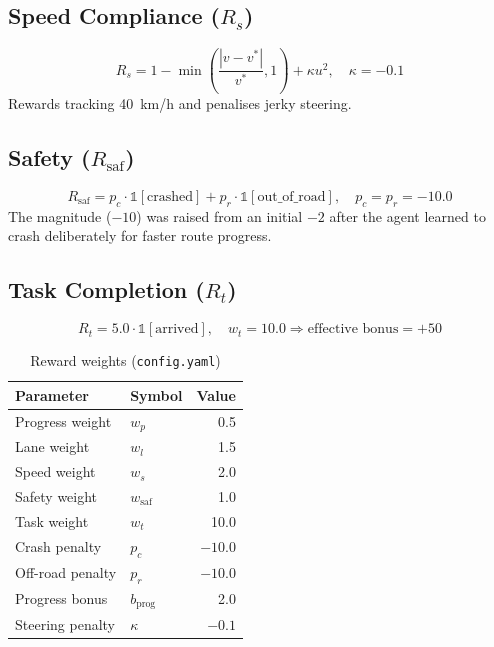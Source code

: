 \documentclass[12pt,a4paper]{report}
\begin{document}
\subsection{Speed Compliance ($R_s$)}
\begin{equation}
R_s = 1 - \min\!\left(\frac{|v-v^*|}{v^*}, 1\right) + \kappa u^2, \quad \kappa = -0.1
\end{equation}
Rewards tracking 40~km/h and penalises jerky steering.

\subsection{Safety ($R_{\text{saf}}$)}
\begin{equation}
R_{\text{saf}} = p_c \cdot \mathbb{1}[\text{crashed}] + p_r \cdot \mathbb{1}[\text{out\_of\_road}], \quad p_c = p_r = -10.0
\end{equation}
The magnitude ($-10$) was raised from an initial $-2$ after the agent learned to crash deliberately for faster route progress.

\subsection{Task Completion ($R_t$)}
\begin{equation}
R_t = 5.0 \cdot \mathbb{1}[\text{arrived}], \quad w_t = 10.0 \Rightarrow \text{effective bonus} = +50
\end{equation}

\begin{table}[H]
\centering
\caption{Reward weights (\texttt{config.yaml})}
\label{tab:weights}
\begin{tabular}{llr}
\toprule
Parameter & Symbol & Value \\
\midrule
Progress weight    & $w_p$             & 0.5 \\
Lane weight        & $w_l$             & 1.5 \\
Speed weight       & $w_s$             & 2.0 \\
Safety weight      & $w_{\text{saf}}$  & 1.0 \\
Task weight        & $w_t$             & 10.0 \\
Crash penalty      & $p_c$             & $-10.0$ \\
Off-road penalty   & $p_r$             & $-10.0$ \\
Progress bonus     & $b_{\text{prog}}$ & 2.0 \\
Steering penalty   & $\kappa$          & $-0.1$ \\
\bottomrule
\end{tabular}
\end{table}
\end{document}
